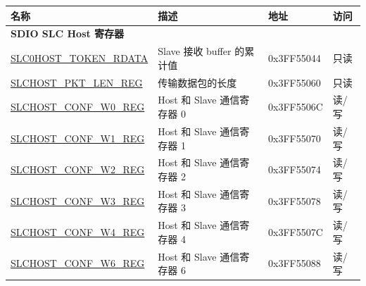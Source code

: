\documentclass[sdio_slave.tex]{subfiles}
\begin{document}
\begin{longtable}{ | p{6cm} | p{7cm} | p{2cm} | p{1cm} | }
\hline\rowcolor{lightgray}
名称 & 描述 &  地址 & 访问 \\ \hline
\multicolumn{4}{|l|}{\textbf{SDIO SLC Host 寄存器}} \\ \hline
\hyperref[regdesc:SLC0HOSTTOKENRDATA]{SLC0HOST\_TOKEN\_RDATA} & Slave 接收 buffer 的累计值  & 0x3FF55044 & 只读 \\ \hline
\hyperref[regdesc:SLCHOSTPKTLENREG]{SLCHOST\_PKT\_LEN\_REG} &传输数据包的长度 & 0x3FF55060 & 只读 \\ \hline
\hyperref[regdesc:SLCHOSTCONFW0REG]{SLCHOST\_CONF\_W0\_REG} & Host 和 Slave 通信寄存器 0 & 0x3FF5506C & 读/写 \\ \hline
\hyperref[regdesc:SLCHOSTCONFW1REG]{SLCHOST\_CONF\_W1\_REG} & Host 和 Slave 通信寄存器 1& 0x3FF55070 & 读/写 \\ \hline
\hyperref[regdesc:SLCHOSTCONFW2REG]{SLCHOST\_CONF\_W2\_REG} &Host 和 Slave 通信寄存器 2 & 0x3FF55074 & 读/写 \\ \hline
\hyperref[regdesc:SLCHOSTCONFW3REG]{SLCHOST\_CONF\_W3\_REG} &Host 和 Slave 通信寄存器 3 & 0x3FF55078 & 读/写 \\ \hline
\hyperref[regdesc:SLCHOSTCONFW4REG]{SLCHOST\_CONF\_W4\_REG} &Host 和 Slave 通信寄存器 4 & 0x3FF5507C & 读/写 \\ \hline
\hyperref[regdesc:SLCHOSTCONFW6REG]{SLCHOST\_CONF\_W6\_REG} & Host 和 Slave 通信寄存器 6& 0x3FF55088 & 读/写 \\ \hline


\end{longtable}
\end{document}
